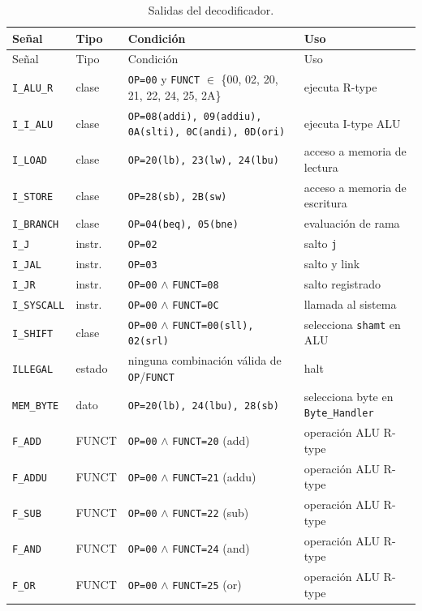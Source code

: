 \documentclass[11pt,a4paper]{article}
\begin{document}
\begin{longtable}{@{}p{2.4cm}p{2.2cm}p{4.5cm}p{6.0cm}@{}}
\caption{Salidas del decodificador.}
\label{tab:decoder}\\
\toprule
Señal & Tipo & Condición & Uso \\
\midrule
\endfirsthead
\toprule
Señal & Tipo & Condición & Uso \\
\midrule
\endhead
\texttt{I\_ALU\_R} & clase & \texttt{OP=00} y \texttt{FUNCT} $\in$ \{00, 02, 20, 21, 22, 24, 25, 2A\} & ejecuta R-type \\
\texttt{I\_I\_ALU} & clase & \texttt{OP=08(addi), 09(addiu), 0A(slti), 0C(andi), 0D(ori)} & ejecuta I-type ALU \\
\texttt{I\_LOAD} & clase & \texttt{OP=20(lb), 23(lw), 24(lbu)} & acceso a memoria de lectura \\
\texttt{I\_STORE} & clase & \texttt{OP=28(sb), 2B(sw)} & acceso a memoria de escritura \\
\texttt{I\_BRANCH} & clase & \texttt{OP=04(beq), 05(bne)} & evaluación de rama \\
\texttt{I\_J} & instr. & \texttt{OP=02} & salto \texttt{j} \\
\texttt{I\_JAL} & instr. & \texttt{OP=03} & salto y link \\
\texttt{I\_JR} & instr. & \texttt{OP=00} $\land$ \texttt{FUNCT=08} & salto registrado \\
\texttt{I\_SYSCALL} & instr. & \texttt{OP=00} $\land$ \texttt{FUNCT=0C} & llamada al sistema \\
\texttt{I\_SHIFT} & clase & \texttt{OP=00} $\land$ \texttt{FUNCT=00(sll), 02(srl)} & selecciona \texttt{shamt} en ALU \\
\texttt{ILLEGAL} & estado & ninguna combinación válida de \texttt{OP}/\texttt{FUNCT} & halt \\
\texttt{MEM\_BYTE} & dato & \texttt{OP=20(lb), 24(lbu), 28(sb)} & selecciona byte en \texttt{Byte\_Handler} \\
\texttt{F\_ADD} & FUNCT & \texttt{OP=00} $\land$ \texttt{FUNCT=20} (add) & operación ALU R-type \\
\texttt{F\_ADDU} & FUNCT & \texttt{OP=00} $\land$ \texttt{FUNCT=21} (addu) & operación ALU R-type \\
\texttt{F\_SUB} & FUNCT & \texttt{OP=00} $\land$ \texttt{FUNCT=22} (sub) & operación ALU R-type \\
\texttt{F\_AND} & FUNCT & \texttt{OP=00} $\land$ \texttt{FUNCT=24} (and) & operación ALU R-type \\
\texttt{F\_OR} & FUNCT & \texttt{OP=00} $\land$ \texttt{FUNCT=25} (or) & operación ALU R-type \\

\end{longtable}
\end{document}
